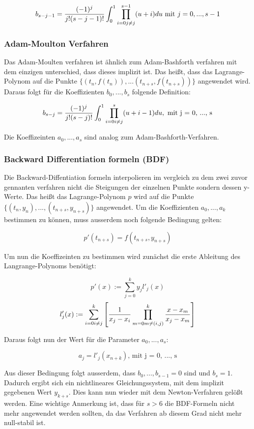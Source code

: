 $$
b_{s - j - 1} = \frac{(-1)^j}{j!(s- j -1 )!} \int_0^1 \prod_{i = 0 \\ j \neq j}^{s-1} (u + i) du \text{ mit } j = 0, ...,  s-1 
$$

\subsubsection{Adam-Moulton Verfahren} \label{adam-moulton}

Das Adam-Moulten verfahren ist ähnlich zum
Adam-Bashforth verfahren mit dem einzigen unterschied, dass dieses implizit ist.
Das heißt, dass das Lagrange-Polynom auf die Punkte $\{(t_{n}, f(t_{n})), ... (t_{n+s}, f(t_{n+s}))\} $ angewendet wird.
Daraus folgt für die Koeffizienten $b_{0}, ..., b_{s}$ folgende Definition:

$$
b_{s - j} = \frac{(-1)^j}{j!(s - j)!} \int_0^{1} \prod_{i = 0 \\ i \neq j}^{s} (u + i - 1) du, \text{ mit j = 0, ..., s}
$$

Die Koeffizeinten $a_0, ..., a_s$ sind analog zum Adam-Bashforth-Verfahren.


\subsubsection{Backward Differentiation formeln (BDF)} \label{sec:bdf}

Die Backward-Diffentiation formeln interpolieren im vergleich zu dem zwei zuvor gennanten verfahren nicht 
die Steigungen der einzelnen Punkte sondern dessen y-Werte.
Das heißt das Lagrange-Polynom $p$ wird auf die Punkte $\{ (t_n, y_n), ..., (t_{n + s}, y_{n + s}) \}$ angewendet.
Um die Koeffizienten $a_0, ..., a_k$ bestimmen zu können, muss ausserdem noch folgende Bedingung gelten:

$$
p'(t_{n + s}) = f(t_{n + s}, y_{n + s})
$$

Um nun die Koeffizeinten zu bestimmen wird zunächst die erste Ableitung des Langrange-Polynoms benötigt:

$$
p'(x) := \sum_{j = 0}^{k} y_j l'_j(x)
$$
$$
l'_j(x) := \sum_{i = 0 \\ i \neq j}^{k} \left[ \frac{1}{x_j - x_i} \prod_{m = 0 \\ m \neq (i, j)}^k \frac{x - x_m}{x_j - x_m} \right]
$$

Daraus folgt nun der Wert für die Parameter $a_0, ... ,a_s$:

$$
a_j = l'_j(x_{n + k}) \text{, mit j = 0, ..., s}
$$

Aus dieser Bedingung folgt ausserdem, dass $b_0, ...,b_{s - 1} = 0$ sind und $b_s = 1$.
Dadurch ergibt sich ein nichtlineares Gleichungssystem, mit dem implizit gegebenen Wert $y_{k + s}$.
Dies kann nun wieder mit dem Newton-Verfahren gelößt werden.
Eine wichtige Anmerkung ist, 
dass für $s > 6$ die BDF-Formeln nicht mehr angewendet werden sollten, 
da das Verfahren ab diesem Grad nicht mehr null-stabil ist.
